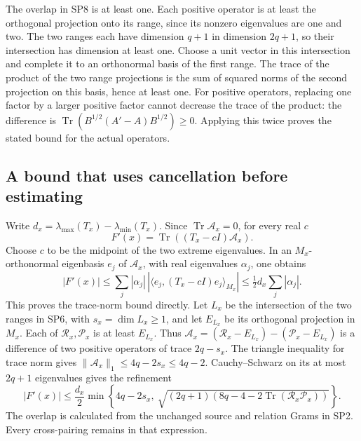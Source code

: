 \documentclass[11pt,a4paper]{article}
\begin{document}
The overlap in SP8 is at least one. Each positive operator is at
least the orthogonal projection onto its range, since its nonzero
eigenvalues are one and two. The two ranges each have dimension
\(q+1\) in dimension \(2q+1\), so their intersection has dimension at
least one. Choose a unit vector in this intersection and complete
it to an orthonormal basis of the first range. The trace of the
product of the two range projections is the sum of squared norms
of the second projection on this basis, hence at least one.
For positive operators, replacing one factor by a larger positive
factor cannot decrease the trace of the product: the difference
is \(\operatorname{Tr}(B^{1/2}(A'-A)B^{1/2})\geq0\).
Applying this twice proves the stated bound for the actual operators.

\subsection{A bound that uses cancellation before estimating}
Write
\(d_x=\lambda_{\max}(T_x)-\lambda_{\min}(T_x)\).
Since \(\operatorname{Tr}\mathcal A_x=0\), for every real \(c\)
\[
       F'(x)=\operatorname{Tr}((T_x-cI)\mathcal A_x).
 \tag{SP9}
\]
Choose \(c\) to be the midpoint of the two extreme eigenvalues.
In an \(M_x\)-orthonormal eigenbasis \(e_j\) of \(\mathcal A_x\),
with real eigenvalues \(\alpha_j\), one obtains
\[
 |F'(x)|
 \leq\sum_j|\alpha_j|\,
       |\langle e_j,(T_x-cI)e_j\rangle_{M_x}|
 \leq\tfrac12d_x\sum_j|\alpha_j|.
\]
This proves the trace-norm bound directly. Let \(L_x\) be the
intersection of the two ranges in SP6, with \(s_x=\dim L_x\geq1\),
and let \(E_{L_x}\) be its orthogonal projection in \(M_x\).
Each of \(\mathcal R_x,\mathcal P_x\) is at least \(E_{L_x}\).
Thus
\(\mathcal A_x=(\mathcal R_x-E_{L_x})-(\mathcal P_x-E_{L_x})\)
is a difference of two positive operators of trace \(2q-s_x\).
The triangle inequality for trace norm gives
\(\|\mathcal A_x\|_1\leq4q-2s_x\leq4q-2\).
Cauchy--Schwarz on its at most \(2q+1\) eigenvalues gives the refinement
\[
 \boxed{
 |F'(x)|\leq\frac{d_x}{2}
 \min\left\{4q-2s_x,\
 \sqrt{(2q+1)
     (8q-4-2\operatorname{Tr}(\mathcal R_x\mathcal P_x))}
     \right\}.}
 \tag{SP10}
\]
The overlap is calculated from the unchanged source and relation
Grams in SP2. Every cross-pairing remains in that expression.
\end{document}

